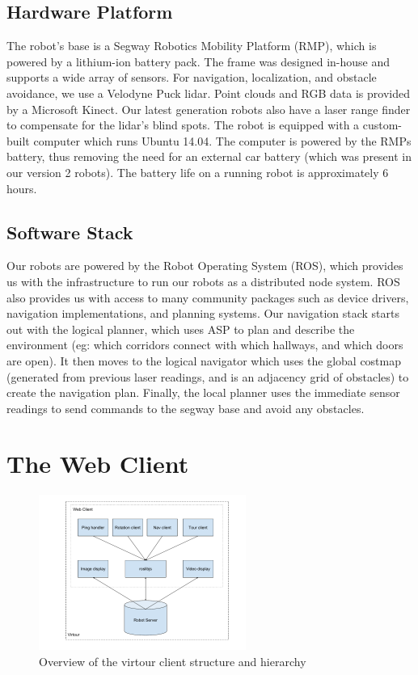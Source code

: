 \documentclass{sig-alternate-05-2015}
\begin{document}
\subsection{Hardware Platform}

The robot's base is a Segway Robotics Mobility Platform (RMP), which is
powered by a lithium-ion battery pack. The frame was designed in-house and
supports a wide array of sensors. For navigation, localization, and obstacle
avoidance, we use a Velodyne Puck lidar. Point clouds and RGB data is provided
by a Microsoft Kinect. Our latest generation robots also have a laser range
finder to compensate for the lidar's blind spots. The robot is equipped with a
custom-built computer which runs Ubuntu 14.04. The computer is powered by the
RMPs battery, thus removing the need for an external car battery (which was
present in our version 2 robots).  The battery life on a running robot is
approximately 6 hours.

\subsection{Software Stack}

Our robots are powered by the Robot Operating System (ROS), which provides us
with the infrastructure to run our robots as a distributed node system. ROS
also provides us with access to many community packages such as device drivers,
navigation implementations, and planning systems. Our navigation stack starts
out with the logical planner, which uses ASP to plan and describe the
environment (eg: which corridors connect with which hallways, and which doors
are open). It then moves to the logical navigator which uses the global costmap
(generated from previous laser readings, and is an adjacency grid of obstacles)
to create the navigation plan.  Finally, the local planner uses the immediate
sensor readings to send commands to the segway base and avoid any obstacles.

\section{The Web Client}

\begin{figure}
\centering
\includegraphics[height=2in]{virtour_client}
\caption{Overview of the virtour client structure and hierarchy}
\end{figure}
\end{document}
